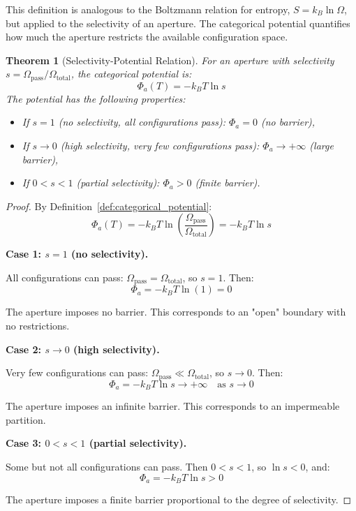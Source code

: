 \documentclass[12pt,a4paper]{article}
\newtheorem{theorem}{Theorem}[section]
\theoremstyle{definition}
\theoremstyle{remark}
\begin{document}
This definition is analogous to the Boltzmann relation for entropy, $S = k_B \ln \Omega$, but applied to the selectivity of an aperture. The categorical potential quantifies how much the aperture restricts the available configuration space.

\begin{theorem}[Selectivity-Potential Relation]
\label{thm:selectivity_potential}
For an aperture with selectivity $s = \Omega_{\text{pass}}/\Omega_{\text{total}}$, the categorical potential is:
\begin{equation}
\Phi_a(T) = -k_B T \ln s
\end{equation}
The potential has the following properties:
\begin{itemize}
    \item If $s = 1$ (no selectivity, all configurations pass): $\Phi_a = 0$ (no barrier),
    \item If $s \to 0$ (high selectivity, very few configurations pass): $\Phi_a \to +\infty$ (large barrier),
    \item If $0 < s < 1$ (partial selectivity): $\Phi_a > 0$ (finite barrier).
\end{itemize}
\end{theorem}

\begin{proof}
By Definition~\ref{def:categorical_potential}:
\begin{equation}
\Phi_a(T) = -k_B T \ln\left(\frac{\Omega_{\text{pass}}}{\Omega_{\text{total}}}\right) = -k_B T \ln s
\end{equation}

\textbf{Case 1: $s = 1$ (no selectivity).}

All configurations can pass: $\Omega_{\text{pass}} = \Omega_{\text{total}}$, so $s = 1$. Then:
\begin{equation}
\Phi_a = -k_B T \ln(1) = 0
\end{equation}

The aperture imposes no barrier. This corresponds to an "open" boundary with no restrictions.

\textbf{Case 2: $s \to 0$ (high selectivity).}

Very few configurations can pass: $\Omega_{\text{pass}} \ll \Omega_{\text{total}}$, so $s \to 0$. Then:
\begin{equation}
\Phi_a = -k_B T \ln s \to +\infty \quad \text{as } s \to 0
\end{equation}

The aperture imposes an infinite barrier. This corresponds to an impermeable partition.

\textbf{Case 3: $0 < s < 1$ (partial selectivity).}

Some but not all configurations can pass. Then $0 < s < 1$, so $\ln s < 0$, and:
\begin{equation}
\Phi_a = -k_B T \ln s > 0
\end{equation}

The aperture imposes a finite barrier proportional to the degree of selectivity.
\end{proof}
\end{document}
